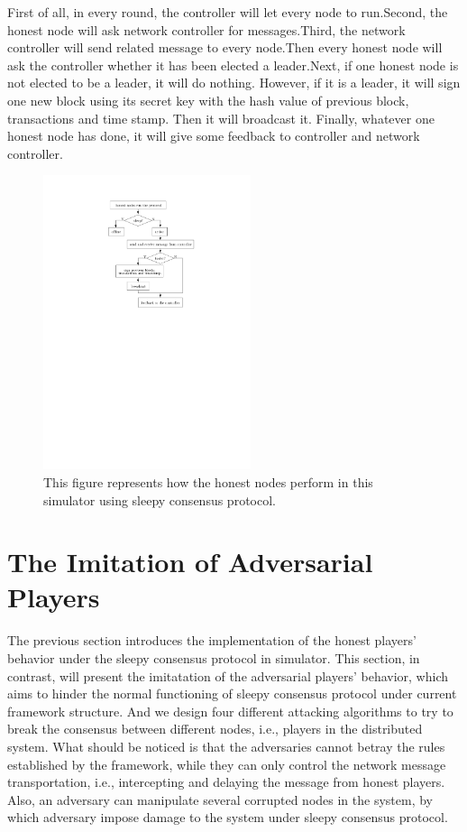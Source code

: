 \documentclass{llncs}
\begin{document}
First of all, in every round, the controller will 	let every node to run.Second, the honest node will ask network controller for messages.Third, the network controller will send related message to every node.Then every honest node will ask the controller whether it  has been elected a leader.Next, if one honest node is not elected to be a leader, it will do nothing. However, if it is a leader, it will sign one new block using its secret key with the hash value of previous block, transactions and time stamp. Then it will broadcast it. Finally, whatever one honest node has done, it will give some feedback to controller and network controller.\\
\vspace{-4mm}
\begin{figure}
\centering
\includegraphics[width=2.4in]{Figures/honest.pdf}
\vspace{-3mm}
\caption{This figure represents how the honest nodes perform in this simulator using sleepy consensus protocol.}
\end{figure}
%
\section{The Imitation of Adversarial Players}
\quad The previous section introduces the implementation of the honest players' behavior under the sleepy consensus protocol in simulator. This section, in contrast, will present the imitatation of the adversarial players' behavior, which aims to hinder the normal functioning of sleepy consensus protocol under current framework structure. And we design four different attacking algorithms to try to break the consensus between different nodes, i.e., players in the distributed system. What should be noticed is that the adversaries cannot betray the rules established by the framework, while they can only control the network message transportation, i.e., intercepting and delaying the message from honest players. Also, an adversary can manipulate several corrupted nodes in the system, by which adversary impose damage to the system under sleepy consensus protocol.
\end{document}
